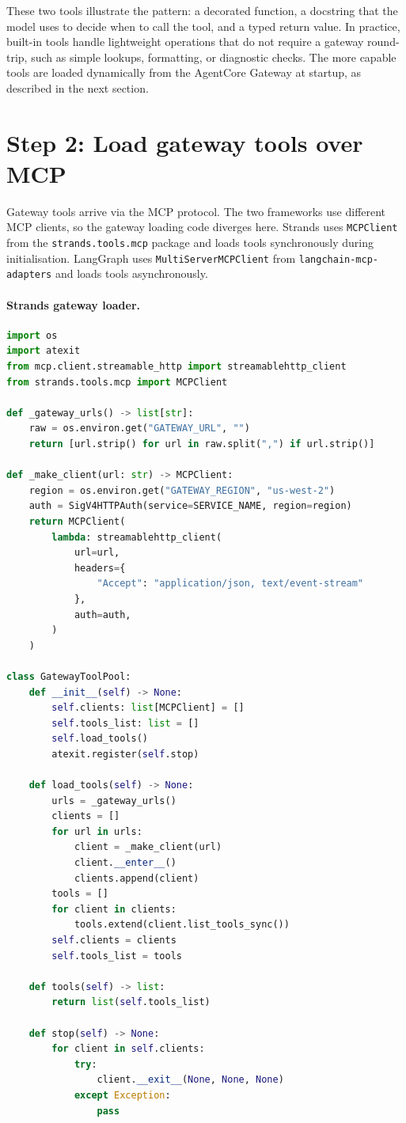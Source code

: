 These two tools illustrate the pattern: a decorated function, a docstring that the model
uses to decide when to call the tool, and a typed return value. In practice, built-in tools
handle lightweight operations that do not require a gateway round-trip, such as simple lookups,
formatting, or diagnostic checks. The more capable tools are loaded dynamically from the
AgentCore Gateway at startup, as described in the next section.

\section{Step 2: Load gateway tools over MCP}

Gateway tools arrive via the MCP protocol. The two frameworks use different MCP clients,
so the gateway loading code diverges here. Strands uses \texttt{MCPClient} from the
\texttt{strands.tools.mcp} package and loads tools synchronously during initialisation.
LangGraph uses \texttt{MultiServerMCPClient} from \texttt{langchain-mcp-adapters} and
loads tools asynchronously.

\paragraph{Strands gateway loader.}

\begin{lstlisting}[language=Python]
import os
import atexit
from mcp.client.streamable_http import streamablehttp_client
from strands.tools.mcp import MCPClient

def _gateway_urls() -> list[str]:
    raw = os.environ.get("GATEWAY_URL", "")
    return [url.strip() for url in raw.split(",") if url.strip()]

def _make_client(url: str) -> MCPClient:
    region = os.environ.get("GATEWAY_REGION", "us-west-2")
    auth = SigV4HTTPAuth(service=SERVICE_NAME, region=region)
    return MCPClient(
        lambda: streamablehttp_client(
            url=url,
            headers={
                "Accept": "application/json, text/event-stream"
            },
            auth=auth,
        )
    )

class GatewayToolPool:
    def __init__(self) -> None:
        self.clients: list[MCPClient] = []
        self.tools_list: list = []
        self.load_tools()
        atexit.register(self.stop)

    def load_tools(self) -> None:
        urls = _gateway_urls()
        clients = []
        for url in urls:
            client = _make_client(url)
            client.__enter__()
            clients.append(client)
        tools = []
        for client in clients:
            tools.extend(client.list_tools_sync())
        self.clients = clients
        self.tools_list = tools

    def tools(self) -> list:
        return list(self.tools_list)

    def stop(self) -> None:
        for client in self.clients:
            try:
                client.__exit__(None, None, None)
            except Exception:
                pass
\end{lstlisting}

